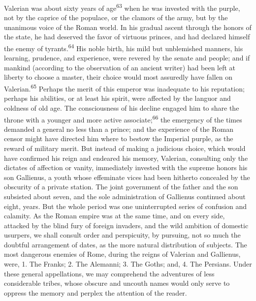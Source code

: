 Valerian was about sixty years of age\textsuperscript{63} when he was invested
with the purple, not by the caprice of the populace, or the
clamors of the army, but by the unanimous voice of the Roman
world. In his gradual ascent through the honors of the state, he
had deserved the favor of virtuous princes, and had declared
himself the enemy of tyrants.\textsuperscript{64} His noble birth, his mild but
unblemished manners, his learning, prudence, and experience, were
revered by the senate and people; and if mankind (according to
the observation of an ancient writer) had been left at liberty to
choose a master, their choice would most assuredly have fallen on
Valerian.\textsuperscript{65} Perhaps the merit of this emperor was inadequate to
his reputation; perhaps his abilities, or at least his spirit,
were affected by the languor and coldness of old age. The
consciousness of his decline engaged him to share the throne with
a younger and more active associate;\textsuperscript{66} the emergency of the
times demanded a general no less than a prince; and the
experience of the Roman censor might have directed him where to
bestow the Imperial purple, as the reward of military merit. But
instead of making a judicious choice, which would have confirmed
his reign and endeared his memory, Valerian, consulting only the
dictates of affection or vanity, immediately invested with the
supreme honors his son Gallienus, a youth whose effeminate vices
had been hitherto concealed by the obscurity of a private
station. The joint government of the father and the son subsisted
about seven, and the sole administration of Gallienus continued
about eight, years. But the whole period was one uninterrupted
series of confusion and calamity. As the Roman empire was at the
same time, and on every side, attacked by the blind fury of
foreign invaders, and the wild ambition of domestic usurpers, we
shall consult order and perspicuity, by pursuing, not so much the
doubtful arrangement of dates, as the more natural distribution
of subjects. The most dangerous enemies of Rome, during the
reigns of Valerian and Gallienus, were, 1. The Franks; 2. The
Alemanni; 3. The Goths; and, 4. The Persians. Under these general
appellations, we may comprehend the adventures of less
considerable tribes, whose obscure and uncouth names would only
serve to oppress the memory and perplex the attention of the
reader.


